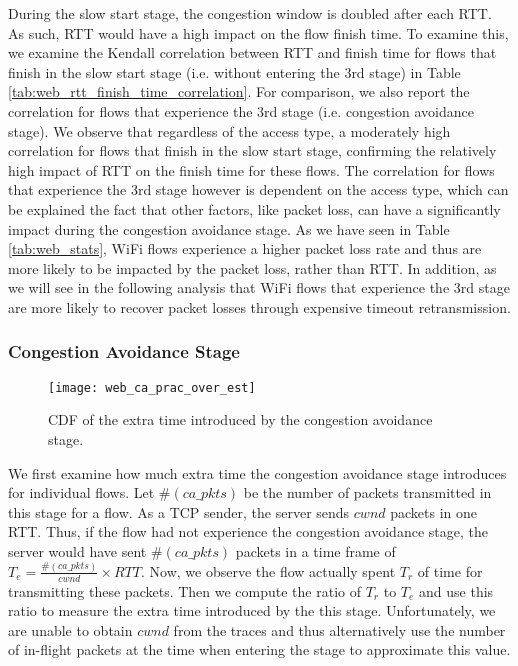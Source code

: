 During the slow start stage, the congestion window is doubled after each RTT. As such, RTT would have a high impact on the flow finish time. To examine this, we examine the Kendall correlation between RTT and finish time for flows that finish in the slow start stage (i.e. without entering the 3rd stage) in Table \ref{tab:web_rtt_finish_time_correlation}. For comparison, we also report the correlation for flows that experience the 3rd stage (i.e. congestion avoidance stage). We observe that regardless of the access type, a moderately high correlation for flows that finish in the slow start stage, confirming the relatively high impact of RTT on the finish time for these flows. The correlation for flows that experience the 3rd stage however is dependent on the access type, which can be explained the fact that other factors, like packet loss, can have a significantly impact during the congestion avoidance stage. As we have seen in Table \ref{tab:web_stats}, WiFi flows experience a higher packet loss rate and thus are more likely to be impacted by the packet loss, rather than RTT. In addition, as we will see in the following analysis that WiFi flows that experience the 3rd stage are more likely to recover packet losses through expensive timeout retransmission. 


\subsubsection{Congestion Avoidance Stage}

\begin{figure}[th]
\centering
\texttt{[image: web\_ca\_prac\_over\_est]}
\caption{CDF of the extra time introduced by the congestion avoidance stage.}
\label{fig:web_ca_round}
\end{figure}

We first examine how much extra time the congestion avoidance stage introduces for individual flows. Let $\#(ca\_pkts)$ be the number of packets transmitted in this stage for a flow. As a TCP sender, the server sends $cwnd$ packets in one RTT. Thus, if the flow had not experience the congestion avoidance stage, the server would have sent $\#(ca\_pkts)$ packets in a time frame of $T_e = \frac{\#(ca\_pkts)}{cwnd} \times RTT$. Now, we observe the flow actually spent $T_r$ of time for transmitting these packets. Then we compute the ratio of  $T_r$ to $T_e$ and use this ratio to measure the extra time introduced by the this stage. Unfortunately, we are unable to obtain $cwnd$ from the traces and thus alternatively use the number of in-flight packets at the time when entering the stage to approximate this value\cite{rfc56812009tcp}. 
 
